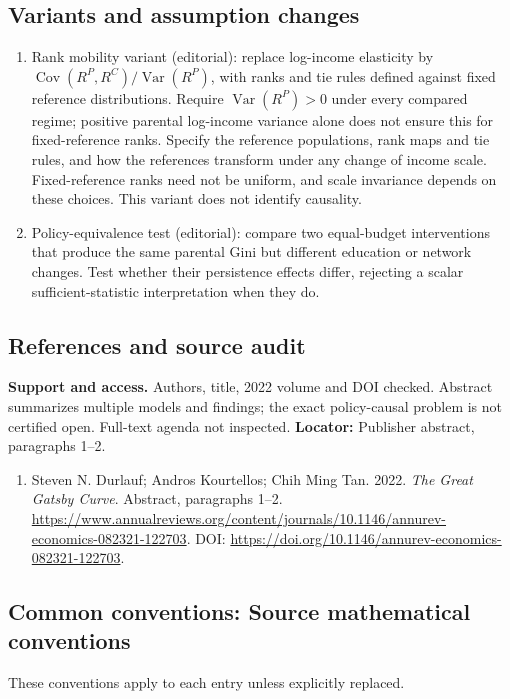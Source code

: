 \documentclass[11pt,a4paper]{article}
\newcommand{\Var}{\operatorname{Var}}
\begin{document}
\subsection*{Variants and assumption changes}
\begin{enumerate}
\item Rank mobility variant (editorial): replace log-income elasticity by \(\operatorname{Cov}(R^P,R^C)/\operatorname{Var}(R^P)\), with ranks and tie rules defined against fixed reference distributions. Require \(\Var(R^P)>0\) under every compared regime; positive parental log-income variance alone does not ensure this for fixed-reference ranks. Specify the reference populations, rank maps and tie rules, and how the references transform under any change of income scale. Fixed-reference ranks need not be uniform, and scale invariance depends on these choices. This variant does not identify causality.
\item Policy-equivalence test (editorial): compare two equal-budget interventions that produce the same parental Gini but different education or network changes. Test whether their persistence effects differ, rejecting a scalar sufficient-statistic interpretation when they do.
\end{enumerate}
\subsection*{References and source audit}
\textbf{Support and access.} Authors, title, 2022 volume and DOI checked. Abstract summarizes multiple models and findings; the exact policy-causal problem is not certified open. Full-text agenda not inspected. \textbf{Locator:} Publisher abstract, paragraphs 1--2.
\begin{enumerate}\raggedright
\item\hypertarget{definitions:source:30007650:1}{} Steven N. Durlauf; Andros Kourtellos; Chih Ming Tan. 2022. \emph{The Great Gatsby Curve}. Abstract, paragraphs 1–2.
\url{https://www.annualreviews.org/content/journals/10.1146/annurev-economics-082321-122703}.
DOI: \url{https://doi.org/10.1146/annurev-economics-082321-122703}.
\end{enumerate}

\subsection*{Common conventions: Source mathematical conventions}

These conventions apply to each entry unless explicitly replaced.
\end{document}
